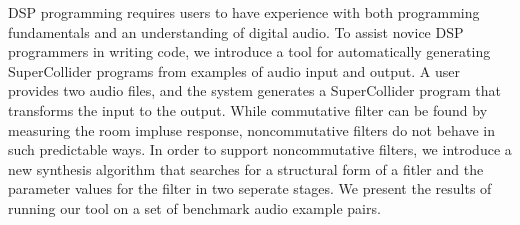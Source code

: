 DSP programming requires users to have experience with both programming fundamentals and an understanding of digital audio.
To assist novice DSP programmers in writing code, we introduce a tool for automatically generating SuperCollider programs from examples of audio input and output.
A user provides two audio files, and the system generates a SuperCollider program that transforms the input to the output.
While commutative filter can be found by measuring the room impluse response, noncommutative filters do not behave in such predictable ways.
In order to support noncommutative filters, we introduce a new synthesis algorithm that searches for a structural form of a fitler and the parameter values for the filter in two seperate stages.
We present the results of running our tool on a set of benchmark audio example pairs.
